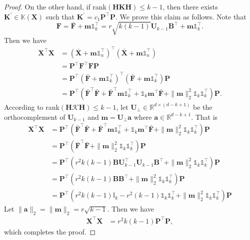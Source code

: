 \documentclass[journal]{IEEEtran}
\begin{document}
\begin{proof}
	On the other hand, if rank$(\mathbf{H}\mathbf{K}\mathbf{H}) \leq k-1$, then there exists $\mathbf{K}^\prime \in \mathbb{K}(\mathbf{X})$ such that $ \mathbf{K}^\prime = c_1\mathbf{P}^\top\mathbf{P}$. We prove this claim as follows. Note that
	\[
	\mathbf{F} = \mathbf{\bar{F}} + \mathbf{m}\mathbb{1}_k^\top = r\sqrt{k(k-1)}\mathbf{U}_{k-1}\mathbf{B}^\top + \mathbf{m}\mathbb{1}_k^\top. 
	\]
	Then we have
	\[
	\begin{aligned}
	\mathbf{X}^\top\mathbf{X} &= \left( \bar{\mathbf{X}} + \mathbf{m}\mathbb{1}_n^\top \right)^\top \left( \bar{\mathbf{X}} + \mathbf{m}\mathbb{1}_n^\top \right) \\
	&= \mathbf{P}^\top\mathbf{F}^\top\mathbf{FP} \\
	&= \mathbf{P}^\top\left( \bar{\mathbf{F}} + \mathbf{m}\mathbb{1}_k^\top \right)^\top \left( \bar{\mathbf{F}} + \mathbf{m}\mathbb{1}_k^\top \right)\mathbf{P} \\
	&= \mathbf{P}^\top\left( \bar{\mathbf{F}}^\top\bar{\mathbf{F}} + \bar{\mathbf{F}}^\top \mathbf{m}\mathbb{1}_k^\top + \mathbb{1}_k\mathbf{m}^\top \bar{\mathbf{F}} + \|\mathbf{m}\|_2^2 \mathbb{1}_k\mathbb{1}_k^\top \right)\mathbf{P}.
	\end{aligned}
	\]
	According to rank$(\mathbf{H}\mathcal{K}\mathbf{H}) \leq k-1$, let $\mathbf{U}_\bot \in \mathbb{R}^{d\times (d-k+1)}$ be the orthocomplement of $\mathbf{U}_{k-1}$ and $\mathbf{m}=\mathbf{U}_\bot \mathbf{a}$ where $\mathbf{a} \in \mathbb{R}^{d-k+1}$. That is
	\[
	\begin{aligned}
	\mathbf{X}^\top\mathbf{X} &= \mathbf{P}^\top\left( \bar{\mathbf{F}}^\top\bar{\mathbf{F}} + \bar{\mathbf{F}}^\top \mathbf{m}\mathbb{1}_k^\top + \mathbb{1}_k\mathbf{m}^\top \bar{\mathbf{F}} + \|\mathbf{m}\|_2^2 \mathbb{1}_k\mathbb{1}_k^\top \right)\mathbf{P} \\
	&= \mathbf{P}^\top\left( \bar{\mathbf{F}}^\top\bar{\mathbf{F}} + \|\mathbf{m}\|_2^2 \mathbb{1}_k\mathbb{1}_k^\top \right)\mathbf{P} \\
	&= \mathbf{P}^\top\left( r^2k(k-1)\mathbf{BU}_{k-1}^\top\mathbf{U}_{k-1}\mathbf{B}^\top + \|\mathbf{m}\|_2^2 \mathbb{1}_k\mathbb{1}_k^\top \right)\mathbf{P} \\
	&= \mathbf{P}^\top\left( r^2k(k-1)\mathbf{B}\mathbf{B}^\top + \|\mathbf{m}\|_2^2 \mathbb{1}_k\mathbb{1}_k^\top \right)\mathbf{P} \\
	&= \mathbf{P}^\top\left( r^2k(k-1)\mathbb{I}_k - r^2(k-1) \mathbb{1}_k\mathbb{1}_k^\top + \|\mathbf{m}\|_2^2 \mathbb{1}_k\mathbb{1}_k^\top \right)\mathbf{P}
	\end{aligned}
	\]
	Let $\|\mathbf{a}\|_2 = \|\mathbf{m}\|_2 =  r\sqrt{k-1}$. Then we have
	\[
	\begin{aligned}
	\mathbf{X}^\top\mathbf{X} &= r^2k(k-1)\mathbf{P}^\top\mathbf{P},
	\end{aligned}
	\]
	which completes the proof.
\end{proof}
\end{document}
